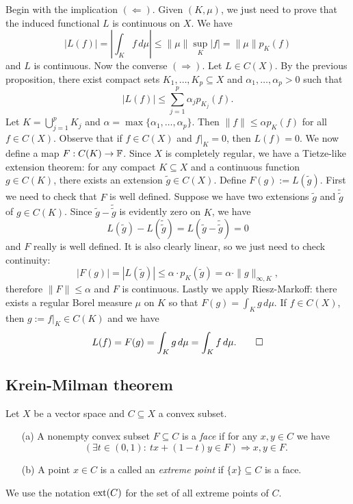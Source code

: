 \begin{myproof}
  Begin with the implication $(\Leftarrow)$. Given $(K, \mu)$, we just need to prove that the induced 
  functional $L$ is continuous on $X$. We have 
  $$|L(f)| = \left| \int_K f\, d\mu \right| \leq \|\mu\| \sup_K |f| = \|\mu\| p_K (f)$$
  and $L$ is continuous. Now the converse $(\Rightarrow)$.
  Let $L \in C(X)$. By the previous proposition, there exist compact sets 
  $K_1, \dots, K_p \subseteq X$ and $\alpha_1, \dots, \alpha_p > 0$ such that 
  $$|L(f)| \leq \sum_{j = 1} ^p \alpha_j p_{K_j} (f).$$
  Let $K = \bigcup_{j = 1} ^p K_j$ and $\alpha = \max \{\alpha_1, \dots, \alpha_p\}$.
  Then $\|f\| \leq \alpha p_K (f)$ for all $f \in C(X)$.
  Observe that if $f \in C(X)$ and $f \big|_K = 0$, then $L(f) = 0$.
  We now define a map $F: C(K) \to \mathbb {F}$. 
  Since $X$ is completely regular, we have a Tietze-like extension theorem: for any compact $K \subseteq X$ and a continuous function $g \in C(K)$,
  there exists an extension $\widetilde{g} \in C(X)$.
  Define $F(g) := L(\widetilde{g})$.
  First we need to check that $F$ is well defined. Suppose we have two extensions $\widetilde{g}$ and $\widetilde{\widetilde{g}}$
  of $g \in C(K)$. Since $\widetilde{g} - \widetilde{\widetilde{g}}$ is evidently zero on $K$, we have 
  $$L(\widetilde{g}) - L(\widetilde{\widetilde{g}}) = L(\widetilde{g} - \widetilde{\widetilde{g}}) = 0$$
  and $F$ really is well defined. It is also clearly linear, so we just need to check continuity:
  $$|F(g)| = |L(\widetilde{g})| \leq \alpha \cdot p_K (\widetilde{g}) = \alpha \cdot \|g\|_{\infty, K},$$
  therefore $\|F\| \leq \alpha$ and $F$ is continuous. Lastly we apply Riesz-Markoff: there exists a regular Borel measure $\mu$ on $K$
  so that $F(g) = \int_K g\, d\mu.$ If $f \in C(X)$, then $g := f\big|_K \in C(K)$
  and we have 
  \begin{equation*}
    L(f) = F(g) = \int_K g\, d\mu = \int_K f \, d\mu. \qedhere
  \end{equation*}
\end{myproof}

\subsection{Krein-Milman theorem}

\begin{definition}
  Let $X$ be a vector space and $C \subseteq X$ a convex subset.
  \begin{itemize}
    \item[(a)] A nonempty convex subset $F \subseteq C$ is a \emph{face} if for any $x, y \in C$ we have
    $$(\exists t \in (0, 1):\ tx + (1 - t)y \in F) \Rightarrow x, y \in F.$$
    \item[(b)] A point $x \in C$ is a called an \emph{extreme point} if $\{x\} \subseteq C$ is a face.  
  \end{itemize}
  We use the notation $\operatorname{ext} (C)$ for the set of all extreme points of $C$.
\end{definition}

